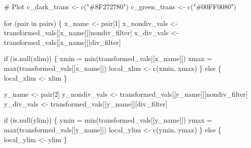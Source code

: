 \documentclass[
  letterpaper,
  DIV=11,
  numbers=noendperiod]{scrartcl}
\newenvironment{Shaded}{\begin{snugshade}}{\end{snugshade}}
\newcommand{\BuiltInTok}[1]{\textcolor[rgb]{0.00,0.23,0.31}{#1}}
\newcommand{\CommentTok}[1]{\textcolor[rgb]{0.37,0.37,0.37}{#1}}
\newcommand{\ControlFlowTok}[1]{\textcolor[rgb]{0.00,0.23,0.31}{#1}}
\newcommand{\DecValTok}[1]{\textcolor[rgb]{0.68,0.00,0.00}{#1}}
\newcommand{\KeywordTok}[1]{\textcolor[rgb]{0.00,0.23,0.31}{#1}}
\newcommand{\NormalTok}[1]{\textcolor[rgb]{0.00,0.23,0.31}{#1}}
\newcommand{\OperatorTok}[1]{\textcolor[rgb]{0.37,0.37,0.37}{#1}}
\newcommand{\StringTok}[1]{\textcolor[rgb]{0.13,0.47,0.30}{#1}}
\begin{document}
\begin{Shaded}
\begin{Highlighting}[]
  \CommentTok{\# Plot}
\NormalTok{  c\_dark\_trans }\OperatorTok{\textless{}{-}}\NormalTok{ c(}\StringTok{"\#8F272780"}\NormalTok{)}
\NormalTok{  c\_green\_trans }\OperatorTok{\textless{}{-}}\NormalTok{ c(}\StringTok{"\#00FF0080"}\NormalTok{)}
  
  \ControlFlowTok{for}\NormalTok{ (pair }\KeywordTok{in}\NormalTok{ pairs) \{}
\NormalTok{    x\_name }\OperatorTok{\textless{}{-}}\NormalTok{ pair[}\DecValTok{1}\NormalTok{]}
\NormalTok{    x\_nondiv\_vals }\OperatorTok{\textless{}{-}}\NormalTok{ transformed\_vals[[x\_name]][nondiv\_filter]}
\NormalTok{    x\_div\_vals    }\OperatorTok{\textless{}{-}}\NormalTok{ transformed\_vals[[x\_name]][div\_filter]}
    
    \ControlFlowTok{if}\NormalTok{ (}\KeywordTok{is}\NormalTok{.null(xlim)) \{}
\NormalTok{      xmin }\OperatorTok{=} \BuiltInTok{min}\NormalTok{(transformed\_vals[[x\_name]])}
\NormalTok{      xmax }\OperatorTok{=} \BuiltInTok{max}\NormalTok{(transformed\_vals[[x\_name]])}
\NormalTok{      local\_xlim }\OperatorTok{\textless{}{-}}\NormalTok{ c(xmin, xmax)}
\NormalTok{    \} }\ControlFlowTok{else}\NormalTok{ \{}
\NormalTok{      local\_xlim }\OperatorTok{\textless{}{-}}\NormalTok{ xlim}
\NormalTok{    \}}
    
\NormalTok{    y\_name }\OperatorTok{\textless{}{-}}\NormalTok{ pair[}\DecValTok{2}\NormalTok{]}
\NormalTok{    y\_nondiv\_vals }\OperatorTok{\textless{}{-}}\NormalTok{ transformed\_vals[[y\_name]][nondiv\_filter]}
\NormalTok{    y\_div\_vals    }\OperatorTok{\textless{}{-}}\NormalTok{ transformed\_vals[[y\_name]][div\_filter]}
    
    \ControlFlowTok{if}\NormalTok{ (}\KeywordTok{is}\NormalTok{.null(ylim)) \{}
\NormalTok{      ymin }\OperatorTok{=} \BuiltInTok{min}\NormalTok{(transformed\_vals[[y\_name]])}
\NormalTok{      ymax }\OperatorTok{=} \BuiltInTok{max}\NormalTok{(transformed\_vals[[y\_name]])}
\NormalTok{      local\_ylim }\OperatorTok{\textless{}{-}}\NormalTok{ c(ymin, ymax)}
\NormalTok{    \} }\ControlFlowTok{else}\NormalTok{ \{}
\NormalTok{      local\_ylim }\OperatorTok{\textless{}{-}}\NormalTok{ ylim}
\NormalTok{    \}}
 

\end{Highlighting}
\end{Shaded}
\end{document}
